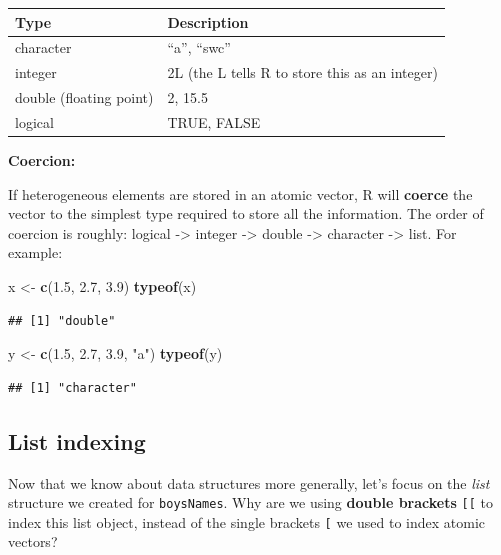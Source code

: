 \documentclass[
]{book}
\newenvironment{Shaded}{\begin{snugshade}}{\end{snugshade}}
\newcommand{\FloatTok}[1]{\textcolor[rgb]{0.00,0.00,0.81}{#1}}
\newcommand{\KeywordTok}[1]{\textcolor[rgb]{0.13,0.29,0.53}{\textbf{#1}}}
\newcommand{\NormalTok}[1]{#1}
\newcommand{\StringTok}[1]{\textcolor[rgb]{0.31,0.60,0.02}{#1}}
\begin{document}
\begin{longtable}[]{@{}ll@{}}
\toprule
Type & Description\tabularnewline
\midrule
\endhead
character & ``a'', ``swc''\tabularnewline
integer & 2L (the L tells R to store this as an integer)\tabularnewline
double (floating point) & 2, 15.5\tabularnewline
logical & TRUE, FALSE\tabularnewline
\bottomrule
\end{longtable}

\textbf{Coercion:}

If heterogeneous elements are stored in an atomic vector, R will \textbf{coerce} the vector to the simplest type required to store all the information. The order of coercion is roughly: logical -\textgreater{} integer -\textgreater{} double -\textgreater{} character -\textgreater{} list. For example:

\begin{Shaded}
\begin{Highlighting}[]
\NormalTok{x \textless{}{-}}\StringTok{ }\KeywordTok{c}\NormalTok{(}\FloatTok{1.5}\NormalTok{, }\FloatTok{2.7}\NormalTok{, }\FloatTok{3.9}\NormalTok{)}
\KeywordTok{typeof}\NormalTok{(x)}
\end{Highlighting}
\end{Shaded}

\begin{verbatim}
## [1] "double"
\end{verbatim}

\begin{Shaded}
\begin{Highlighting}[]
\NormalTok{y \textless{}{-}}\StringTok{ }\KeywordTok{c}\NormalTok{(}\FloatTok{1.5}\NormalTok{, }\FloatTok{2.7}\NormalTok{, }\FloatTok{3.9}\NormalTok{, }\StringTok{"a"}\NormalTok{)}
\KeywordTok{typeof}\NormalTok{(y)}
\end{Highlighting}
\end{Shaded}

\begin{verbatim}
## [1] "character"
\end{verbatim}

\hypertarget{list-indexing}{%
\subsection{List indexing}\label{list-indexing}}

Now that we know about data structures more generally, let's focus on the \emph{list} structure we created for \texttt{boysNames}.
Why are we using \textbf{double brackets} \texttt{{[}{[}} to index this list object, instead of the single brackets \texttt{{[}} we used to index atomic vectors?
\end{document}

